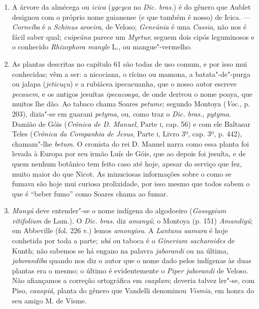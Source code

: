 \begin{enumerate}
\item A árvore da almécega ou \textit{icica} (\textit{ygcyca} no \textit{Dic. bras.}) é do gênero que Aublet 
designou com o próprio nome guianense (e que também é nosso) de Icica. --- \textit{Corneíba} 
é a \textit{Schinus aroeira}, de Veloso; \textit{Geneúnia} é uma \textit{Cassia}, não nos é fácil saber qual; 
\textit{cuipeúna} parece um \textit{Myrtus}; seguem dois cipós leguminosos e  o  conhecido  
\textit{Rhizophora mangle} L., ou mangue"-vermelho.

\item  As plantas descritas no capítulo 61 são todas de uso comum, e por isso mui 
conhecidas; vêm a ser: a nicociana, o rícino ou mamona, a batata"-de"-purga ou jalapa 
(\textit{jeticuçu}) e a rubiácea ipecacuanha, que o nosso autor escreve \textit{pecauem}, e os antigos jesuítas  
\textit{ipecacoaya}, de onde derivou o nome poaya,  que muitos lhe dão. Ao tabaco chama Soares  \textit{petume}; segundo 
Montoya (\textit{Voc.}, p. 203), dizia"-se em guarani \textit{petyma},  ou, como traz o \textit{Dic. 
bras.}, \textit{pytyma}. Damião de Góis (\textit{Crônica de D. Manuel}, Parte \textsc{i}, cap. 56) e com ele Baltasar 
Teles (\textit{Crônica da Companhia de Jesus}, Parte \textsc{i}, Livro 3º, cap. 3º, p. 442), chamam"-lhe \textit{betum}.  
O cronista do rei D. Manuel narra como essa planta foi levada à Europa por seu 
irmão Luís de Góis, que ao depois foi jesuíta, e de quem nenhum botânico tem feito caso até 
hoje, apesar do serviço que fez, muito maior do que Nicot. As minuciosas informações sobre 
o como se fumava são hoje mui curiosa prolixidade, por isso mesmo que todos sabem o que 
é ``beber fumo'' como Soares chama ao fumar.

\item  \textit{Manyú} deve entender"-se o nome indígena do algodoeiro (\textit{Gossypium vitifolium} de 
Lam.). O \textit{Dic. bras.} diz \textit{amanyú}; o Montoya (p. 151) \textit{Amandiyú}; em Abbeville (fol. 226 v.) 
lemos \textit{amonyiou}. A \textit{Lantana aamara} é hoje conhetida por toda a parte; \textit{ubá} ou taboca é o 
\textit{Ginerium sacharoides} de Kunth; não sabemos se há 
engano na palavra \textit{jaborandi} ou na última, \textit{jaborandiba} quando nos diz o autor que o 
nome dado pelos indígenas às duas plantas era o mesmo; o último é evidentemente o 
\textit{Piper jaborandi} de Veloso. Não afiançamos a correção ortográfica em \textit{caaplam}; deveria talvez ler"-se, com Piso, \textit{caaopiá}, planta do gênero que Vandelli denominou \textit{Vismia}, em honra do seu 
amigo M. de Visme.


\end{enumerate}
